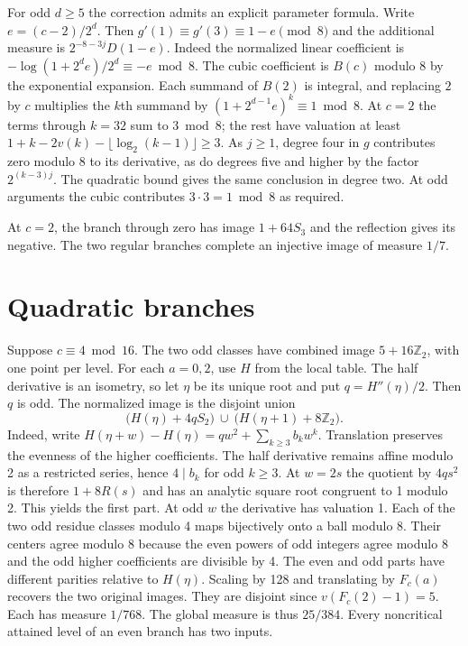 \documentclass[11pt]{article}
\newcommand{\Z}{\mathbb Z_2}
\begin{document}
For odd $d\ge5$ the correction admits an explicit parameter formula.
Write $e=(c-2)/2^d$. Then $g'(1)\equiv g'(3)\equiv 1-e\pmod8$ and the additional measure is $2^{-8-3j}D(1-e)$. Indeed the normalized linear coefficient is $-\log(1+2^d e)/2^d\equiv-e\bmod8$. The cubic coefficient is $B(c)$ modulo 8 by the exponential expansion. Each summand of $B(2)$ is integral, and replacing $2$ by $c$ multiplies the $k$th summand by $(1+2^{d-1}e)^k\equiv1\bmod8$. At $c=2$ the terms through $k=32$ sum to $3\bmod8$; the rest have valuation at least $1+k-2v(k)-\lfloor\log_2(k-1)\rfloor\ge3$. As $j\ge1$, degree four in $g$ contributes zero modulo 8 to its derivative, as do degrees five and higher by the factor $2^{(k-3)j}$. The quadratic bound gives the same conclusion in degree two. At odd arguments the cubic contributes $3\cdot3=1\bmod8$ as required.

At $c=2$, the branch through zero has image $1+64 S_3$ and the reflection gives its negative. The two regular branches complete an injective image of measure $1/7$.
\section{Quadratic branches}
Suppose $c\equiv4\bmod16$. The two odd classes have combined image $5+16\Z$, with one point per level. For each $a=0,2$, use $H$ from the local table. The half derivative is an isometry, so let $\eta$ be its unique root and put $q=H''(\eta)/2$. Then $q$ is odd. The normalized image is the disjoint union
\[
 \bigl(H(\eta)+4q S_2\bigr)\ \cup\
 \bigl(H(\eta+1)+8\Z\bigr).
\]
Indeed, write $H(\eta+w)-H(\eta)=qw^2+\sum_{k\ge3}b_kw^k$. Translation preserves the evenness of the higher coefficients. The half derivative remains affine modulo 2 as a restricted series, hence $4\mid b_k$ for odd $k\ge3$. At $w=2s$ the quotient by $4qs^2$ is therefore $1+8R(s)$ and has an analytic square root congruent to 1 modulo 2. This yields the first part. At odd $w$ the derivative has valuation 1. Each of the two odd residue classes modulo 4 maps bijectively onto a ball modulo 8. Their centers agree modulo 8 because the even powers of odd integers agree modulo 8 and the odd higher coefficients are divisible by 4. The even and odd parts have different parities relative to $H(\eta)$.
Scaling by 128 and translating by $F_c(a)$ recovers the two original images. They are disjoint since $v(F_c(2)-1)=5$. Each has measure $1/768$. The global measure is thus $25/384$. Every noncritical attained level of an even branch has two inputs.
\end{document}
